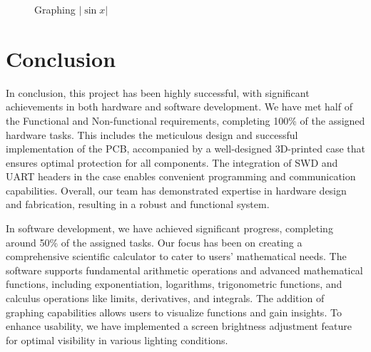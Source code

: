 \documentclass[a4paper, twoside]{report}
\begin{document}
\begin{figure}[H]
    \centering
    \quad
    \caption{Graphing $|\sin x|$}
\end{figure}

\chapter{Conclusion}
In conclusion, this project has been highly successful, with significant achievements in both hardware and software development. We have met half of the Functional and Non-functional requirements, completing 100\% of the assigned hardware tasks. This includes the meticulous design and successful implementation of the PCB, accompanied by a well-designed 3D-printed case that ensures optimal protection for all components. The integration of SWD and UART headers in the case enables convenient programming and communication capabilities. Overall, our team has demonstrated expertise in hardware design and fabrication, resulting in a robust and functional system.

In software development, we have achieved significant progress, completing around 50\% of the assigned tasks. Our focus has been on creating a comprehensive scientific calculator to cater to users' mathematical needs. The software supports fundamental arithmetic operations and advanced mathematical functions, including exponentiation, logarithms, trigonometric functions, and calculus operations like limits, derivatives, and integrals. The addition of graphing capabilities allows users to visualize functions and gain insights. To enhance usability, we have implemented a screen brightness adjustment feature for optimal visibility in various lighting conditions.
\end{document}
